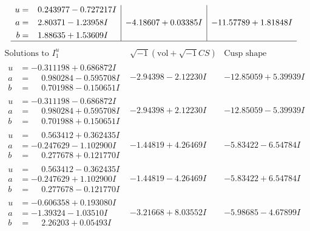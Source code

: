 \documentclass[1p]{elsarticle_modified}
\theoremstyle{definition}
\newcommand{\I}{\sqrt{-1}}
\begin{document}
$$\begin{array}{c|c|c}
\begin{aligned}
u &= \phantom{-}0.243977 - 0.727217 I \\
a &= \phantom{-}2.80371 - 1.23958 I \\
b &= \phantom{-}1.88635 + 1.53609 I\end{aligned}
 & -4.18607 + 0.03385 I & -11.57789 + 1.81848 I\\
 \hline 
 \end{array}$$\newpage$$\begin{array}{c|c|c}  
\text{Solutions to }I^u_{1}& \I (\text{vol} + \sqrt{-1}CS) & \text{Cusp shape}\\
 \hline 
\begin{aligned}
u &= -0.311198 + 0.686872 I \\
a &= \phantom{-}0.980284 - 0.595708 I \\
b &= \phantom{-}0.701988 - 0.150651 I\end{aligned}
 & -2.94398 - 2.12230 I & -12.85059 + 5.39939 I \\ \hline\begin{aligned}
u &= -0.311198 - 0.686872 I \\
a &= \phantom{-}0.980284 + 0.595708 I \\
b &= \phantom{-}0.701988 + 0.150651 I\end{aligned}
 & -2.94398 + 2.12230 I & -12.85059 - 5.39939 I \\ \hline\begin{aligned}
u &= \phantom{-}0.563412 + 0.362435 I \\
a &= -0.247629 - 1.102900 I \\
b &= \phantom{-}0.277678 + 0.121770 I\end{aligned}
 & -1.44819 + 4.26469 I & -5.83422 - 6.54784 I \\ \hline\begin{aligned}
u &= \phantom{-}0.563412 - 0.362435 I \\
a &= -0.247629 + 1.102900 I \\
b &= \phantom{-}0.277678 - 0.121770 I\end{aligned}
 & -1.44819 - 4.26469 I & -5.83422 + 6.54784 I \\ \hline\begin{aligned}
u &= -0.606358 + 0.193080 I \\
a &= -1.39324 - 1.03510 I \\
b &= \phantom{-}2.26203 + 0.05493 I\end{aligned}
 & -3.21668 + 8.03552 I & -5.98685 - 4.67899 I \\ \hline\begin{aligned}

\end{aligned}
\end{array}$$
\end{document}
